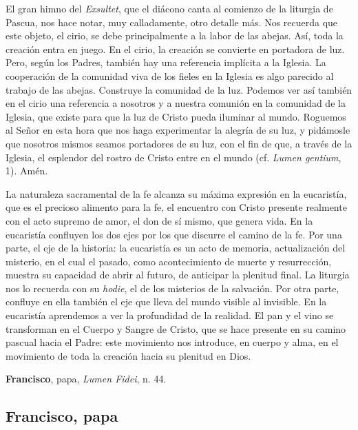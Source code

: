 \begin{body}
El gran himno del \textit{Exsultet}, que el diácono canta al comienzo de la liturgia de Pascua, nos hace notar, muy calladamente, otro detalle más. Nos recuerda que este objeto, el cirio, se debe principalmente a la labor de las abejas. Así, toda la creación entra en juego. En el cirio, la creación se convierte en portadora de luz. Pero, según los Padres, también hay una referencia implícita a la Iglesia. La cooperación de la comunidad viva de los fieles en la Iglesia es algo parecido al trabajo de las abejas. Construye la comunidad de la luz. Podemos ver así también en el cirio una referencia a nosotros y a nuestra comunión en la comunidad de la Iglesia, que existe para que la luz de Cristo pueda iluminar al mundo. Roguemos al Señor en esta hora que nos haga experimentar la alegría de su luz, y pidámosle que nosotros mismos seamos portadores de su luz, con el fin de que, a través de la Iglesia, el esplendor del rostro de Cristo entre en el mundo (cf. \textit{Lumen gentium}, 1). Amén.
\end{body}

\begin{patercite}
La naturaleza sacramental de la fe alcanza su máxima expresión en la eucaristía, que es el precioso alimento para la fe, el encuentro con Cristo presente realmente con el acto supremo de amor, el don de sí mismo, que genera vida. En la eucaristía confluyen los dos ejes por los que discurre el camino de la fe. Por una parte, el eje de la historia: la eucaristía es un acto de memoria, actualización del misterio, en el cual el pasado, como acontecimiento de muerte y resurrección, muestra su capacidad de abrir al futuro, de anticipar la plenitud final. La liturgia nos lo recuerda con su \textit{hodie}, el  de los misterios de la salvación. Por otra parte, confluye en ella también el eje que lleva del mundo visible al invisible. En la eucaristía aprendemos a ver la profundidad de la realidad. El pan y el vino se transforman en el Cuerpo y Sangre de Cristo, que se hace presente en su camino pascual hacia el Padre: este movimiento nos introduce, en cuerpo y alma, en el movimiento de toda la creación hacia su plenitud en Dios.

\textbf{Francisco}, papa, \textit{Lumen Fidei}, n. 44.
\end{patercite}

\newsection
\subsection{Francisco, papa}

